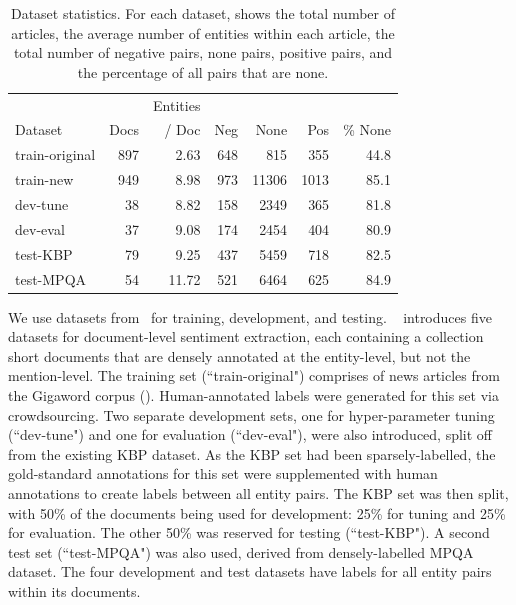 \documentclass[11pt,a4paper]{article}
\begin{document}
\begin{table}[!t]
\centering
\begin{tabular}{| l | r | r | r | r | r | r |}
\hline
 & & Entities & & & & \\
Dataset & Docs & / Doc & Neg & None & Pos & \% None \\ \hline \hline
train-original & 897 & 2.63 & 648 & 815 & 355 & 44.8 \\
train-new & 949	 & 8.98 & 973 & 11306 & 1013 & 85.1 \\
dev-tune & 38 & 8.82 & 158 & 2349 & 365 & 81.8 \\
dev-eval& 37 & 9.08 & 174 & 2454 & 404 & 80.9 \\
test-KBP & 79 & 9.25 & 437 & 5459 & 718 & 82.5 \\
test-MPQA & 54 & 11.72 & 521 & 6464 & 625 & 84.9 \\
\hline
\end{tabular}
\caption{\label{tab:data} Dataset statistics. For each dataset, shows the total number of articles, the average number of entities within each article, the total number of negative pairs, none pairs, positive pairs, and the percentage of all pairs that are none.}
\end{table}

We use datasets from~ for training, development, and testing.
~ introduces five datasets for document-level sentiment extraction, each containing a collection short documents that are densely annotated at the entity-level, but not the mention-level.
The training set (``train-original") comprises of news articles from the Gigaword corpus ().
Human-annotated labels were generated for this set via crowdsourcing.
Two separate development sets, one for hyper-parameter tuning (``dev-tune") and one for evaluation (``dev-eval"), were also introduced, split off from the existing KBP dataset.
As the KBP set had been sparsely-labelled, the gold-standard annotations for this set were supplemented with human annotations to create labels between all entity pairs.
The KBP set was then split, with 50\% of the documents being used for development: 25\% for tuning and 25\% for 
evaluation. The other 50\% was reserved for testing (``test-KBP").
A second test set (``test-MPQA") was also used, derived from densely-labelled MPQA dataset.
The four development and test datasets have labels for all entity pairs within its documents.
\end{document}
